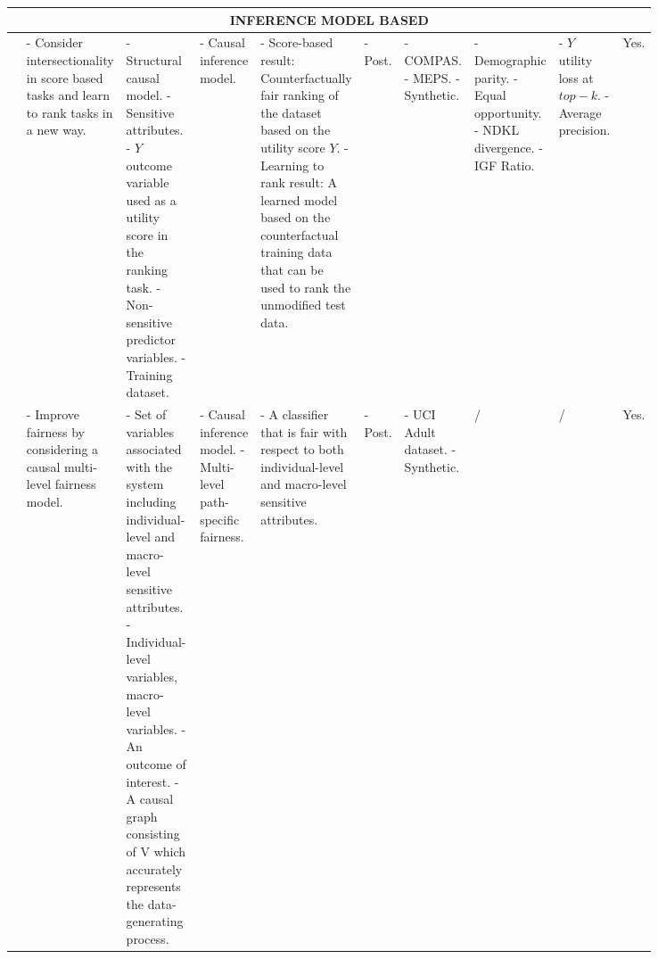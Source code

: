 \begin{landscape}
\begin{longtable}{|p{0.05\linewidth}|p{0.077\linewidth}|p{0.171\linewidth}|p{0.092\linewidth}|p{0.121\linewidth}|p{0.042\linewidth}|p{0.077\linewidth}|p{0.06\linewidth}|p{0.094\linewidth}|p{0.052\linewidth}|}
\multicolumn{10}{|c|}{\textbf{INFERENCE MODEL BASED}} \\ \hline
\cite{yang2020causal} %
& - Consider intersectionality in score based tasks and learn to rank tasks in a new way. 
& - Structural causal model.\newline
- Sensitive attributes.\newline
- $Y$ outcome variable used as a utility score in the ranking task.\newline
- Non-sensitive predictor variables.\newline
- Training dataset. 
& - Causal inference model. 
& - Score-based result: Counterfactually fair ranking of the dataset based on the utility score $Y$.\newline
- Learning to rank result: A learned model based on the counterfactual training data that can be used to rank the unmodified test data. 
& - Post. 
& - COMPAS.\newline
- MEPS.\newline
- Synthetic.  
& - Demographic parity.\newline
- Equal opportunity.\newline
- NDKL divergence.\newline
- IGF Ratio. 
& - $Y$ utility loss at $top-k$.\newline
- Average precision. 
& Yes. \\ \hline

\cite{mhasawade2021causal} %
& - Improve fairness by considering a causal multi-level fairness model. 
& - Set of variables associated with the system including individual-level and macro-level sensitive attributes.\newline
- Individual-level variables, macro-level variables.\newline
- An outcome of interest.\newline
- A causal graph consisting of V which accurately represents the data-generating process.
& - Causal inference model.\newline
- Multi-level path-specific fairness. 
& - A classifier that is fair with respect to both individual-level and macro-level sensitive attributes. 
& - Post. 
& - UCI Adult dataset.\newline
- Synthetic.  
& / 
& / 
& Yes. \\ \hline


\end{longtable}
\end{landscape}
